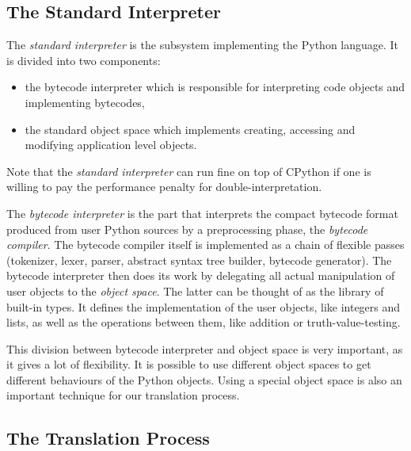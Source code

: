 \documentclass[a4paper,11pt,english]{article}
\begin{document}

\hypertarget{the-standard-interpreter}{}
\subsection{The Standard Interpreter}

The \emph{standard interpreter} is the subsystem implementing the Python language.
It is divided into two components:
\begin{itemize}
\item {} 
the bytecode interpreter which is responsible for interpreting 
code objects and implementing bytecodes,

\item {} 
the standard object space which implements creating, accessing and
modifying application level objects.

\end{itemize}

Note that the \emph{standard interpreter} can run fine on top of CPython if one
is willing to pay the performance penalty for double-interpretation.

The \emph{bytecode interpreter} is the part that interprets the compact
bytecode format produced from user Python sources by a preprocessing
phase, the \emph{bytecode compiler}.  The bytecode compiler itself is
implemented as a chain of flexible passes (tokenizer, lexer, parser,
abstract syntax tree builder, bytecode generator).  The bytecode
interpreter then does its work by delegating all actual manipulation of
user objects to the \emph{object space}.  The latter can be thought of as the
library of built-in types.  It defines the implementation of the user
objects, like integers and lists, as well as the operations between
them, like addition or truth-value-testing.

This division between bytecode interpreter and object space is very
important, as it gives a lot of flexibility. It is possible to use
different object spaces to get different behaviours of the Python
objects.  Using a special object space is also an important technique
for our translation process.



\hypertarget{the-translation-process}{}
\subsection{The Translation Process}
\end{document}

